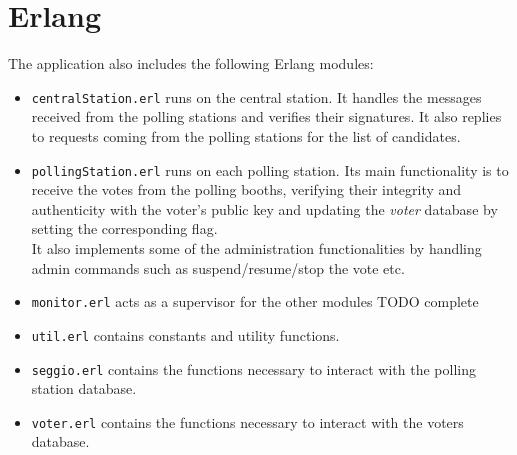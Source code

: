 %
\chapter{Erlang}\label{ch:erlang}
The application also includes the following Erlang modules:
\hfill \break
{}

\begin{itemize}

	\item \texttt{centralStation.erl} runs on the central station. It handles the messages received from the polling stations and verifies their signatures. It also replies to requests coming from the polling stations for the list of candidates.
	\item \texttt{pollingStation.erl} runs on each polling station. Its main functionality is to receive the votes from the polling booths, verifying their integrity and authenticity with the voter's public key and updating the \textit{voter} database by setting the corresponding flag.\\
	 It also implements some of the administration functionalities by handling admin commands such as suspend/resume/stop the vote etc.
	 \item \texttt{monitor.erl} acts as a supervisor for the other modules TODO complete
	 \item \texttt{util.erl} contains constants and utility functions.
	 \item \texttt{seggio.erl} contains the functions necessary to interact with the polling station database.
	 \item \texttt{voter.erl} contains the functions necessary to interact with the voters database.

\end{itemize}